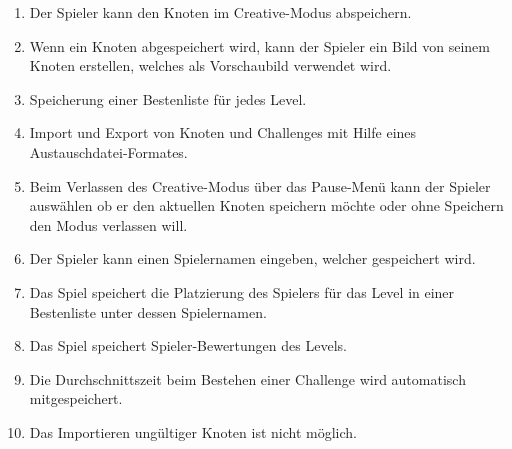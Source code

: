 \begin{enumerate}[resume]

\item Der Spieler kann den Knoten im Creative-Modus abspeichern.
\item Wenn ein Knoten abgespeichert wird, kann der Spieler ein Bild von seinem Knoten erstellen, welches als Vorschaubild verwendet wird. %
\item Speicherung einer Bestenliste für jedes Level.
\item Import und Export von Knoten und Challenges mit Hilfe eines Austauschdatei-Formates.
\item Beim Verlassen des Creative-Modus über das Pause-Menü  kann der Spieler auswählen ob er den aktuellen Knoten speichern möchte oder ohne Speichern den Modus verlassen will. %
\item Der Spieler kann einen Spielernamen eingeben, welcher gespeichert wird.
\item Das Spiel speichert die Platzierung des Spielers  für das Level in einer Bestenliste unter dessen Spielernamen.
\item Das Spiel speichert Spieler-Bewertungen des Levels. %
\item Die Durchschnittszeit beim Bestehen einer Challenge wird automatisch mitgespeichert. %
\item Das Importieren ungültiger Knoten ist nicht möglich.


\end{enumerate}

	
